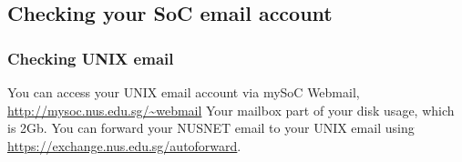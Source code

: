 \documentclass[a4paper]{beamer}
\newcommand{\ftitle}[1]{\frametitle<presentation>{#1}}
\begin{document}
\subsection{Checking your SoC email account}
\begin{frame}
\ftitle{Checking UNIX email}
You can access your UNIX email account via mySoC Webmail, \url{http://mysoc.nus.edu.sg/~webmail}
Your mailbox part of your disk usage, which is 2Gb. You can forward your NUSNET
email to your UNIX email using \url{https://exchange.nus.edu.sg/autoforward}.
\end{frame}
\end{document}
